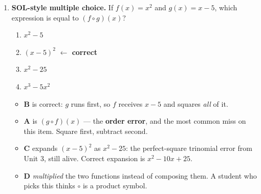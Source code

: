 \documentclass[10pt]{article}
\begin{document}
\begin{enumerate}[leftmargin=1.8em, itemsep=10pt]
  \item \textbf{SOL-style multiple choice.} If $f(x)=x^{2}$ and $g(x)=x-5$, which expression is
        equal to $(f\circ g)(x)$?
        \begin{enumerate}[label=\Alph*., leftmargin=1.9em, itemsep=1pt]
          \item $x^{2}-5$
          \item $(x-5)^{2}$ \quad \textcolor{keyred}{\textbf{$\leftarrow$ correct}}
          \item $x^{2}-25$
          \item $x^{3}-5x^{2}$
        \end{enumerate}
        \vspace{2pt}
        \begin{itemize}[leftmargin=1.4em, nosep]
          \item \textbf{B} is correct: $g$ runs first, so $f$ receives $x-5$ and squares
                \emph{all} of it.
          \item \textbf{A} is $(g\circ f)(x)$ --- the \textbf{order error}, and the most common miss
                on this item. Square first, subtract second.
          \item \textbf{C} expands $(x-5)^{2}$ as $x^{2}-25$: the perfect-square trinomial error from
                Unit 3, still alive. Correct expansion is $x^{2}-10x+25$.
          \item \textbf{D} \emph{multiplied} the two functions instead of composing them. A student
                who picks this thinks $\circ$ is a product symbol.
        \end{itemize}
\end{enumerate}
\end{document}
